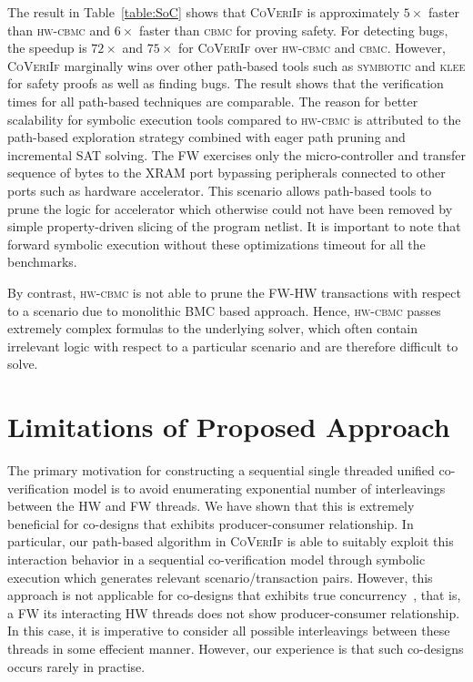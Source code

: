 \documentclass[sigconf]{acmart}
\newcommand{\tool}[1]{\textsc{#1}\xspace}
\newcommand{\cbmcv}{\tool{cbmc}}
\newcommand{\hwcbmcv}{\tool{hw-cbmc}}
\newcommand{\verifox}{\tool{CoVeriIf}}
\newcommand{\klee}{\tool{klee}}
\newcommand{\symbiotic}{\tool{symbiotic}}
\begin{document}
The result in Table~\ref{table:SoC} shows that \verifox is approximately
$5\times$ faster than \hwcbmcv and $6\times$ faster than \cbmcv for proving
safety.  For detecting bugs, the speedup is $72\times$ and $75\times$ for
\verifox over \hwcbmcv and \cbmcv.  However, \verifox marginally wins over
other path-based tools such as \symbiotic and \klee for safety proofs as
well as finding bugs. The result shows that the verification times for all
path-based techniques are comparable.  The reason for better scalability for
symbolic execution tools compared to \hwcbmcv is attributed to the path-based 
exploration strategy combined with eager path pruning and incremental SAT
solving. The FW exercises only the micro-controller
and transfer sequence of bytes to the XRAM port bypassing peripherals
connected to other ports such as hardware accelerator.  This scenario
allows path-based tools to prune the logic for accelerator which otherwise
could not have been removed by simple property-driven slicing of the
program netlist.  It is important to note that forward symbolic execution without
these optimizations timeout for all the benchmarks.

By contrast, \hwcbmcv is not able to prune the FW-HW transactions with
respect to a scenario due to monolithic BMC based approach.  Hence, \hwcbmcv
passes extremely complex formulas to the underlying solver, which often
contain irrelevant logic with respect to a particular scenario and are
therefore difficult to solve.

\section{Limitations of Proposed Approach}
The primary motivation for constructing a sequential single threaded unified 
co-verification model is to avoid enumerating exponential number of interleavings 
between the HW and FW threads.  We have shown that this is extremely beneficial for 
co-designs that exhibits producer-consumer relationship.  
In particular, our path-based algorithm in \verifox is able to suitably exploit 
this interaction behavior in a sequential co-verification model through symbolic 
execution which generates relevant scenario/transaction pairs.  However, this approach 
is not applicable for co-designs that exhibits true concurrency~\cite{concurrency}, 
that is, a FW its interacting HW threads does not show producer-consumer relationship.  
In this case, it is imperative to consider all possible interleavings between
these threads in some effecient manner.  However, our experience is that such 
co-designs occurs rarely in practise. 
\end{document}
